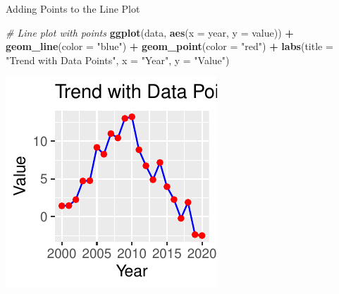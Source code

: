 \documentclass[
  ignorenonframetext,
]{beamer}
\newenvironment{Shaded}{\begin{snugshade}}{\end{snugshade}}
\newcommand{\AttributeTok}[1]{\textcolor[rgb]{0.13,0.29,0.53}{#1}}
\newcommand{\CommentTok}[1]{\textcolor[rgb]{0.56,0.35,0.01}{\textit{#1}}}
\newcommand{\FunctionTok}[1]{\textcolor[rgb]{0.13,0.29,0.53}{\textbf{#1}}}
\newcommand{\NormalTok}[1]{#1}
\newcommand{\SpecialCharTok}[1]{\textcolor[rgb]{0.81,0.36,0.00}{\textbf{#1}}}
\newcommand{\StringTok}[1]{\textcolor[rgb]{0.31,0.60,0.02}{#1}}
\begin{document}
\begin{frame}[fragile]{Adding Points to the Line Plot}
\label{adding-points-to-the-line-plot}

\begin{Shaded}
\begin{Highlighting}[]
\CommentTok{\# Line plot with points}
\FunctionTok{ggplot}\NormalTok{(data, }\FunctionTok{aes}\NormalTok{(}\AttributeTok{x =}\NormalTok{ year, }\AttributeTok{y =}\NormalTok{ value)) }\SpecialCharTok{+} \FunctionTok{geom\_line}\NormalTok{(}\AttributeTok{color =} \StringTok{"blue"}\NormalTok{) }\SpecialCharTok{+}
    \FunctionTok{geom\_point}\NormalTok{(}\AttributeTok{color =} \StringTok{"red"}\NormalTok{) }\SpecialCharTok{+} \FunctionTok{labs}\NormalTok{(}\AttributeTok{title =} \StringTok{"Trend with Data Points"}\NormalTok{,}
    \AttributeTok{x =} \StringTok{"Year"}\NormalTok{, }\AttributeTok{y =} \StringTok{"Value"}\NormalTok{)}
\end{Highlighting}
\end{Shaded}

\begin{center}\includegraphics[width=0.5\linewidth]{Figs/unnamed-chunk-57-1} \end{center}
\end{frame}
\end{document}
